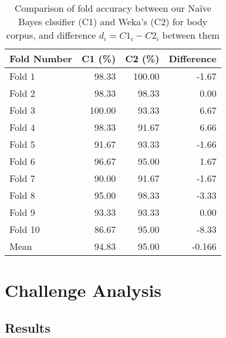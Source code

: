 \documentclass[10pt, a4paper]{article}
\begin{document}
\begin{table}[H]
\centering
\caption{Comparison of fold accuracy between our Na\"ive Bayes clssifier (C1) and Weka's (C2) for body corpus, and difference $d_{i} = C1_{i} - C2_{i}$ between them}\vspace{1em}
\begin{tabular}{@{}lrrr@{}}
\toprule
\textbf{Fold Number} & \textbf{C1 (\%)} & \textbf{C2 (\%)}
	& \textbf{Difference} \\
\midrule
Fold 1 & 98.33 & 100.00 & -1.67 \\
Fold 2 & 98.33 & 98.33 & 0.00 \\
Fold 3 & 100.00 & 93.33 & 6.67 \\
Fold 4 & 98.33 & 91.67 & 6.66 \\
Fold 5 & 91.67 & 93.33 & -1.66 \\
Fold 6 & 96.67 & 95.00 & 1.67 \\
Fold 7 & 90.00 & 91.67 & -1.67 \\
Fold 8 & 95.00 & 98.33 & -3.33 \\
Fold 9 & 93.33 & 93.33 & 0.00 \\
Fold 10 & 86.67 & 95.00 & -8.33 \\
\bottomrule
Mean & 94.83 & 95.00 & -0.166 \\
\bottomrule
\end{tabular}
\label{table:diffbody}
\end{table}


\section{Challenge Analysis}


\subsection{Results}
\end{document}
